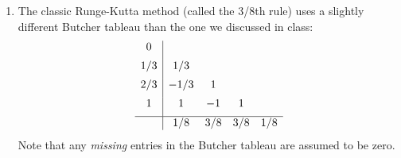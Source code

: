 \documentclass[reqno, answers]{exam}
\begin{document}
\begin{enumerate}
\begin{solution}
        \end{solution}
  \item The classic Runge-Kutta method (called the 3/8th rule) uses a slightly different Butcher tableau than the one we discussed in class:
        \[
          \begin{array}{c|cccc}
            0   &      &     &           \\[0.5em]
            1/3 & 1/3  &     &           \\[0.5em]
            2/3 & -1/3 & 1   &           \\[0.5em]
            1   & 1    & -1  & 1         \\[0.5em]
            \hline
                & 1/8  & 3/8 & 3/8 & 1/8 \\
          \end{array}
        \]
        Note that any \emph{missing} entries in the Butcher tableau are assumed to be zero.
        \begin{solution}
          \begin{parts}

\end{parts}
\end{solution}
\end{enumerate}
\end{document}
